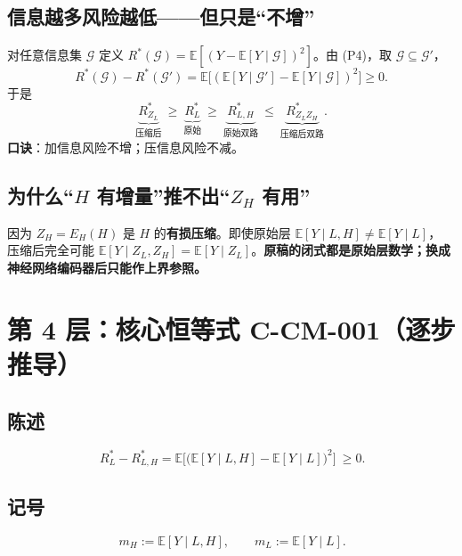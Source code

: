 \documentclass[UTF8,11pt,a4paper]{ctexart}
\newcommand{\E}{\mathbb{E}}
\begin{document}
\subsection{信息越多风险越低——但只是``不增''}
对任意信息集 $\mathcal G$ 定义 $R^*(\mathcal G)=\E[(Y-\E[Y\mid\mathcal G])^2]$。由 (P4)，取 $\mathcal G\subseteq\mathcal G'$，
\[
R^*(\mathcal G)-R^*(\mathcal G')=\E\big[(\E[Y\mid\mathcal G']-\E[Y\mid\mathcal G])^2\big]\ge0 .
\]
于是
\[
\underbrace{R_{Z_L}^*}_{\text{压缩后}}\ \ge\ \underbrace{R_L^*}_{\text{原始}}\ \ge\ \underbrace{R_{L,H}^*}_{\text{原始双路}}\ \le\ \underbrace{R_{Z_LZ_H}^*}_{\text{压缩后双路}} .
\]
\textbf{口诀}：加信息风险不增；压信息风险不减。

\subsection{为什么``$H$ 有增量''推不出``$Z_H$ 有用''}
因为 $Z_H=E_H(H)$ 是 $H$ 的\textbf{有损压缩}。即使原始层 $\E[Y\mid L,H]\ne\E[Y\mid L]$，
压缩后完全可能 $\E[Y\mid Z_L,Z_H]=\E[Y\mid Z_L]$。\textbf{原稿的闭式都是原始层数学；换成神经网络编码器后只能作上界参照。}

\section{第 4 层：核心恒等式 C-CM-001（逐步推导）}

\subsection{陈述}
\[
\boxed{\,R_L^*-R_{L,H}^*=\E\Big[\big(\E[Y\mid L,H]-\E[Y\mid L]\big)^2\Big]\ \ge0.}
\]

\subsection{记号}
\[
\boxed{\,m_H:=\E[Y\mid L,H],\qquad m_L:=\E[Y\mid L].}
\]
\end{document}
